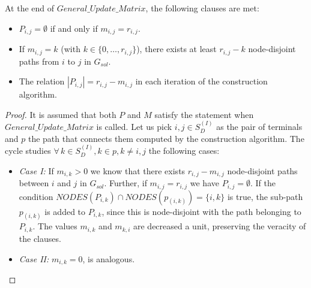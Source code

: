 \begin{proposition}
At the end of $General\_Update\_Matrix$, the following clauses are met:
\begin{itemize}
\item $P_{i,j}= \emptyset$ if and only if $m_{i,j}=r_{i,j}$.
\item If $m_{i,j}=k$ (with $k \in \{0,\ldots,r_{i,j}\}$), there exists at least $r_{i,j}-k$ 
node-disjoint paths from $i$ to $j$ in $G_{sol}$.
\item The relation $|P_{i,j}|=r_{i,j}-m_{i,j}$ in each iteration of the construction algorithm.  
\end{itemize}
\end{proposition}
\begin{proof}
It is assumed that both $P$ and $M$ satisfy the statement when $General\_Update\_Matrix$ is 
called. Let us pick $i,j \in S_{D}^{(I)}$ as the pair of terminals and $p$ the path 
that connects them computed by the construction algorithm. The cycle studies 
$\forall \, k\in S_{D}^{(I)}, k\in p, k \neq i,j$ the following cases:
\begin{itemize}
\item \emph{Case I:} If $m_{i,k}>0$ we know that there exists $r_{i,j}-m_{i,j}$ node-disjoint 
paths between $i$ and $j$ in $G_{sol}$. Further, if $m_{i,j}=r_{i,j}$ we have $P_{i,j}=\emptyset$. If the condition $NODES(P_{i,k}) \cap NODES(p_{(i,k)})=\{i,k\}$ 
is true, the sub-path $p_{(i,k)}$ is added to $P_{i,k}$, since this is node-disjoint with 
the path belonging to $P_{i,k}$. The values $m_{i,k}$ and $m_{k,i}$ are decreased a unit, 
preserving the veracity of the clauses.
\item \emph{Case II:} $m_{i,k}=0$, is analogous.
\end{itemize}
\end{proof}


